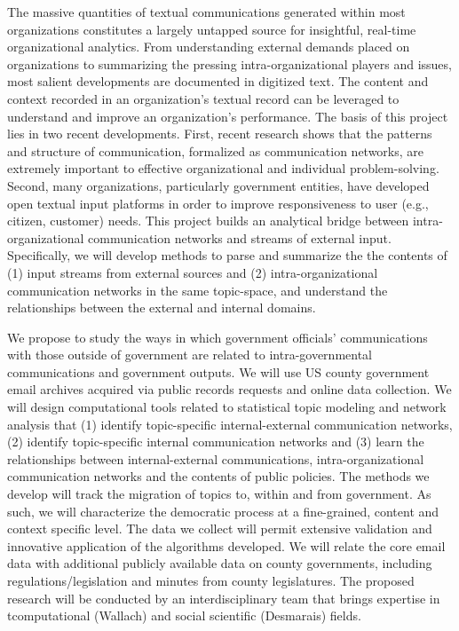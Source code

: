 

 \vspace{.1cm}

\noindent The massive quantities of textual communications generated within most organizations constitutes a largely untapped source for insightful, real-time organizational analytics. From understanding external demands placed on organizations to summarizing the pressing intra-organizational players and issues, most salient developments are documented in digitized text. The content and context recorded in an organization's textual record can be leveraged to understand and improve an organization's performance. The basis of this project lies in two recent developments. First, recent research shows that the patterns and structure of communication, formalized as communication networks, are extremely important to effective organizational and individual problem-solving.  Second, many organizations, particularly government entities, have developed open textual input platforms in order to improve responsiveness to user (e.g., citizen, customer) needs. This project builds an analytical bridge between intra-organizational communication networks and streams of external input. Specifically, we will develop methods to parse and summarize the the contents of (1) input streams from external sources and (2) intra-organizational communication networks in the same topic-space, and understand the relationships between the external and internal domains.  \vspace{.25cm}


 We propose to study the ways in which government officials' communications with those outside of government are related to intra-governmental communications and government outputs. We will use US county government email archives acquired via public records requests and online data collection. We will design computational tools related to statistical topic modeling and network analysis that (1) identify topic-specific internal-external communication networks, (2) identify topic-specific internal communication networks and (3) learn the relationships between internal-external communications, intra-organizational communication networks and the contents of public policies.  The methods we develop will track the migration of topics to, within and from government. As such, we will characterize the democratic process at a fine-grained, content and context specific level.  The data we collect will permit extensive validation and innovative application of the algorithms developed. We will relate the core email data with additional publicly available data on county governments, including regulations/legislation and minutes from county legislatures. The proposed research will be conducted by an interdisciplinary team that brings expertise in tcomputational (Wallach) and social scientific (Desmarais) fields. \vspace{.25cm}

